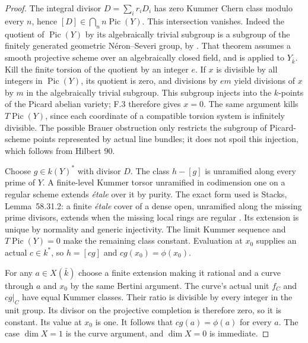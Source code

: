 \begin{proof}
The integral divisor $D=\sum_i r_iD_i$ has zero Kummer Chern
class modulo every $n$, hence $[D]\in\bigcap_n n\operatorname{Pic}(Y)$.
This intersection vanishes. Indeed the quotient of
$\operatorname{Pic}(Y)$ by its algebraically trivial subgroup is
a subgroup of the finitely generated geometric N\'eron--Severi
group, by \citet[Theorem~7.3]{F_CJLO2021}. That theorem assumes a
smooth projective scheme over an algebraically closed field, and
is applied to $Y_{\bar k}$. Kill the finite torsion of the quotient
by an integer $e$. If $x$ is divisible by all integers in
$\operatorname{Pic}(Y)$, its quotient is zero, and divisions by
$em$ yield divisions of $x$ by $m$ in the algebraically trivial
subgroup. This subgroup injects into the $k$-points of the Picard
abelian variety; F.3 therefore gives $x=0$. The same argument
kills $T\operatorname{Pic}(Y)$, since each coordinate of a compatible
torsion system is infinitely divisible. The possible Brauer
obstruction only restricts the subgroup of Picard-scheme points
represented by actual line bundles; it does not spoil this
injection, which follows from Hilbert 90.

Choose $g\in k(Y)^*$ with divisor $D$. The class $h-[g]$ is
unramified along every prime of $Y$. A finite-level Kummer torsor
unramified in codimension one on a regular scheme extends \emph{\'etale}
over it by purity. The exact form used is Stacks,
Lemma~58.31.2: a finite \emph{\'etale} cover of a dense open,
unramified along the missing prime divisors, extends when the
missing local rings are regular \citep{F_StacksPurity}.
Its extension is unique by normality and
generic injectivity. The limit Kummer sequence and
$T\operatorname{Pic}(Y)=0$ make the remaining class constant.
Evaluation at $x_0$ supplies an actual $c\in k^*$, so
$h=[c g]$ and $cg(x_0)=\phi(x_0)$.

For any $a\in X(\bar k)$ choose a finite extension making it
rational and a curve through $a$ and $x_0$ by the same Bertini
argument. The curve's actual unit $f_C$ and $cg|_C$ have equal
Kummer classes. Their ratio is divisible by every integer in the
unit group. Its divisor on the projective completion is therefore
zero, so it is constant. Its value at $x_0$ is one. It follows that
$cg(a)=\phi(a)$ for every $a$. The case $\dim X=1$ is the curve
argument, and $\dim X=0$ is immediate.


\end{proof}
